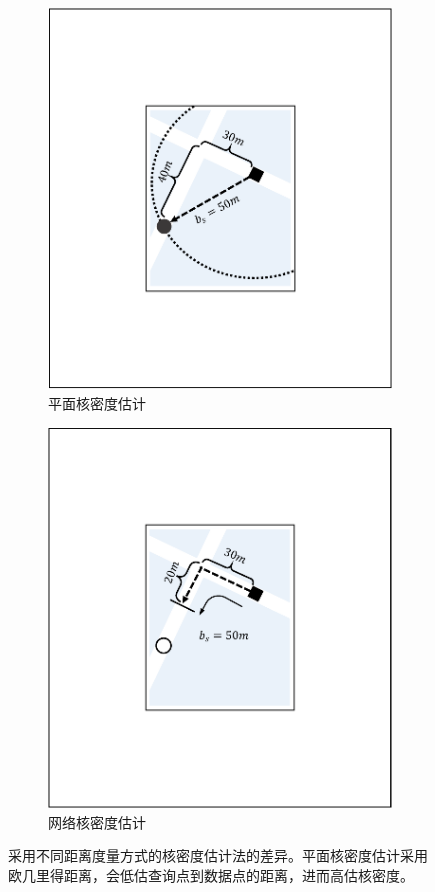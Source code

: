 \begin{figure}[t!]
	\centering
	\begin{subfigure}{0.35\linewidth}
		\centering
		\includegraphics[width=0.8\linewidth]{figures/sec1_kde1.pdf}
		\caption{平面核密度估计}
		\label{subfig:loss_13}
	\end{subfigure}
	\hspace{1em}
	\begin{subfigure}{0.35\linewidth}
		\centering
		\includegraphics[width=0.8\linewidth]{figures/sec1_kde2.pdf}
		\caption{网络核密度估计}
		\label{subfig:loss_12}
	\end{subfigure}
	\caption{采用不同距离度量方式的核密度估计法的差异。平面核密度估计采用欧几里得距离，会低估查询点到数据点的距离，进而高估核密度。}
	\label{fig:kde_example}
\end{figure}

